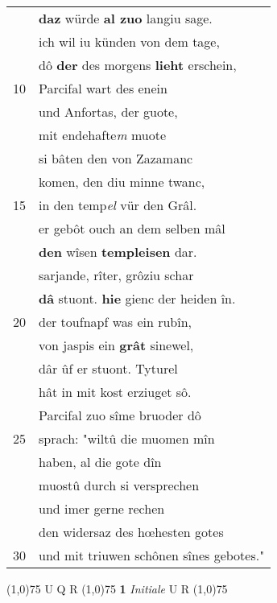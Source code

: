 \documentclass[8pt,a4paper,notitlepage]{article}
\begin{document}
\begin{table}[ht]
\begin{minipage}[t]{0.5\linewidth}
\begin{tabular}{rl}
 & \textbf{daz} würde \textbf{al zuo} langiu sage.\\ 
 & ich wil iu künden von dem tage,\\ 
 & dô \textbf{der} des morgens \textbf{lieht} erschein,\\ 
10 & Parcifal wart des enein\\ 
 & und Anfortas, der guote,\\ 
 & mit endehafte\textit{m} muote\\ 
 & si bâten den von Zazamanc\\ 
 & komen, den diu minne twanc,\\ 
15 & in den temp\textit{el} vür den Grâl.\\ 
 & er gebôt ouch an dem selben mâl\\ 
 & \textbf{den} wîsen \textbf{templeisen} dar.\\ 
 & sarjande, rîter, grôziu schar\\ 
 & \textbf{dâ} stuont. \textbf{hie} gienc der heiden în.\\ 
20 & der toufnapf was ein rubîn,\\ 
 & von jaspis ein \textbf{grât} sinewel,\\ 
 & dâr ûf er stuont. Tyturel\\ 
 & hât in mit kost erziuget sô.\\ 
 & Parcifal zuo sîme bruoder dô\\ 
25 & sprach: "wiltû die muomen mîn\\ 
 & haben, al die gote dîn\\ 
 & muostû durch si versprechen\\ 
 & und imer gerne rechen\\ 
 & den widersaz des hœhesten gotes\\ 
30 & und mit triuwen schônen sînes gebotes."\\ 
\end{tabular}
\scriptsize
\line(1,0){75} \newline
U Q R \newline
\line(1,0){75} \newline
\textbf{1} \textit{Initiale} U R  \newline
\line(1,0){75} \newline

\end{minipage}
\end{table}
\end{document}

